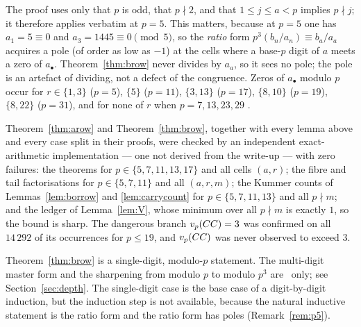 \begin{remark}[$p=5$ is not exceptional]\label{rem:p5}
The proof uses only that $p$ is odd, that $p\nmid2$, and that $1\le j\le a<p$ implies
$p\nmid j$; it therefore applies verbatim at $p=5$. This matters, because at $p=5$ one has
$a_1=5\equiv0$ and $a_3=1445\equiv0\pmod5$, so the \emph{ratio} form
$p^3(b_n/a_n)\equiv b_a/a_a$ acquires a pole (of order as low as $-1$) at the cells where
a base-$p$ digit of $a$ meets a zero of $a_\bullet$. Theorem~\ref{thm:brow} never divides
by $a_a$, so it sees no pole; the pole is an artefact of dividing, not a defect of the
congruence. Zeros of $a_\bullet$ modulo $p$ occur for $r\in\{1,3\}$ ($p=5$), $\{5\}$
($p=11$), $\{3,13\}$ ($p=17$), $\{8,10\}$ ($p=19$), $\{8,22\}$ ($p=31$), and for none of
$r$ when $p=7,13,23,29$ .
\end{remark}

\begin{remark}\label{rem:verify3}
Theorem~\ref{thm:arow} and Theorem~\ref{thm:brow}, together with every lemma above and
every case split in their proofs, were checked by an independent exact-arithmetic
implementation --- one not derived from the write-up --- with zero failures: the theorems
for $p\in\{5,7,11,13,17\}$ and all cells $(a,r)$; the fibre and tail factorisations for
$p\in\{5,7,11\}$ and all $(a,r,m)$; the Kummer counts of Lemmas~\ref{lem:borrow} and
\ref{lem:carrycount} for $p\in\{5,7,11,13\}$ and all $p\nmid m$; and the ledger of
Lemma~\ref{lem:V}, whose minimum over all $p\nmid m$ is exactly $1$, so the bound is
sharp. The dangerous branch $v_p(CC)=3$ was confirmed on all $14\,292$ of its occurrences
for $p\le19$, and $v_p(CC)$ was never observed to exceed $3$.
\end{remark}

\begin{remark}\label{rem:not-proved}
Theorem~\ref{thm:brow} is a single-digit, modulo-$p$ statement. The multi-digit master
form and the sharpening from modulo $p$ to modulo $p^3$ are \Verified\ only; see
Section~\ref{sec:depth}. The single-digit case is the base case of a digit-by-digit
induction, but the induction step is not available, because the natural inductive
statement is the ratio form and the ratio form has poles (Remark~\ref{rem:p5}).
\end{remark}

